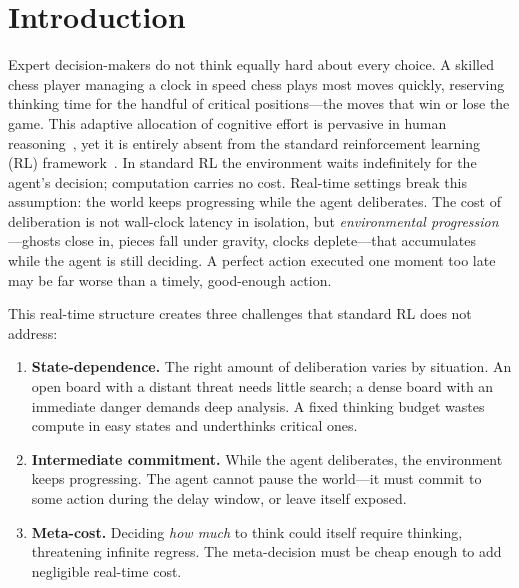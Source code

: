 \section{Introduction}

Expert decision-makers do not think equally hard about every choice.
A skilled chess player managing a clock in speed chess plays most moves
quickly, reserving thinking time for the handful of critical positions—the
moves that win or lose the game.
This adaptive allocation of cognitive effort is pervasive in human
reasoning~\citep{griffiths2019doing}, yet it is entirely absent from the
standard reinforcement learning (RL) framework~\citep{travnik2018reactive,
ramstedt2019rtrl}.
In standard RL the environment waits indefinitely for the agent's decision;
computation carries no cost.
Real-time settings break this assumption: the world keeps progressing while
the agent deliberates.
The cost of deliberation is not wall-clock latency in isolation, but
\emph{environmental progression}—ghosts close in, pieces fall under gravity,
clocks deplete—that accumulates while the agent is still deciding.
A perfect action executed one moment too late may be far worse than a timely,
good-enough action.

This real-time structure creates three challenges that standard RL does not
address:
\begin{enumerate}[nosep, leftmargin=*]
  \item \textbf{State-dependence.}
    The right amount of deliberation varies by situation.
    An open board with a distant threat needs little search; a dense board
    with an immediate danger demands deep analysis.
    A fixed thinking budget wastes compute in easy states and underthinks
    critical ones.
  \item \textbf{Intermediate commitment.}
    While the agent deliberates, the environment keeps progressing.
    The agent cannot pause the world—it must commit to some action during
    the delay window, or leave itself exposed.
  \item \textbf{Meta-cost.}
    Deciding \emph{how much} to think could itself require thinking,
    threatening infinite regress.
    The meta-decision must be cheap enough to add negligible real-time cost.
\end{enumerate}

